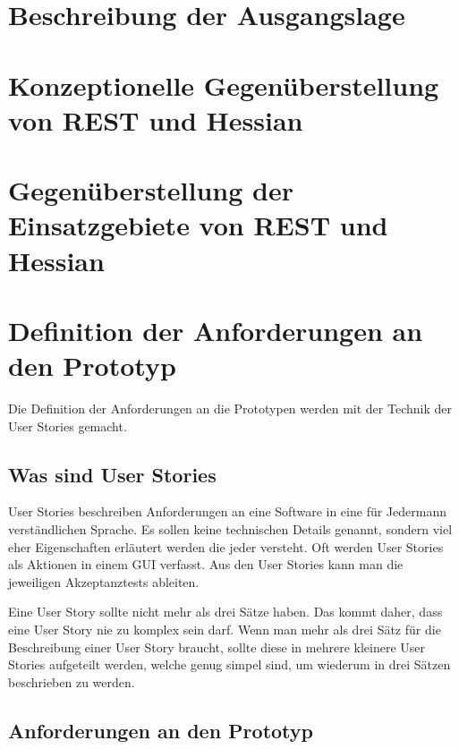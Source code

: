 \documentclass[listof=totocnumbered, bibliography=totocnumbered]{scrreprt}
\begin{document}
  
  \section{Beschreibung der Ausgangslage}
  
  
  \newpage
  
  \section{Konzeptionelle Gegenüberstellung von REST und Hessian}
  
  
  \newpage
  
  \section{Gegenüberstellung der Einsatzgebiete von REST und Hessian}
  
  
  \newpage
  
  \section{Definition der Anforderungen an den Prototyp}
  
  Die Definition der Anforderungen an die Prototypen werden mit der Technik der
  User Sto\-ries\cite{UserStories} gemacht.
  
  \subsection{Was sind User Stories}
  
  User Stories beschreiben Anforderungen an eine Software in eine für Jedermann
  verständlichen Sprache. Es sollen keine technischen Details genannt, sondern
  viel eher Eigenschaften erläutert werden die jeder versteht. Oft werden User
  Stories als Aktionen in einem \ac{GUI} verfasst. Aus den User Stories kann
  man die jeweiligen Akzeptanztests\cite{AcceptanceTests} ableiten.
  
  Eine User Story sollte nicht mehr als drei Sätze haben. Das kommt daher, dass
  eine User Story nie zu komplex sein darf. Wenn man mehr als drei Sätz für die
  Beschreibung einer User Story braucht, sollte diese in mehrere kleinere User
  Stories aufgeteilt werden, welche genug simpel sind, um wiederum in drei
  Sätzen beschrieben zu werden.
  
  \subsection{Anforderungen an den Prototyp}
  
\end{document}
